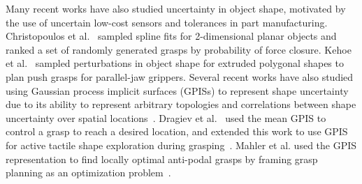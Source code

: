 \documentclass[a4paper, 10pt, conference]{ieeeconf}      %
\begin{document}
Many recent works have also studied uncertainty in object shape, motivated by the use of uncertain low-cost sensors and tolerances in part manufacturing.
Christopoulos et al.~\cite{christopoulos2007handling} sampled spline fits for 2-dimensional planar objects and ranked a set of randomly generated grasps by probability of force closure.
Kehoe et al.~\cite{kehoe2012estimating, kehoe2012toward} sampled perturbations in object shape for extruded polygonal shapes to plan push grasps for parallel-jaw grippers.
Several recent works have also studied using Gaussian process implicit surfaces (GPISs) to represent shape uncertainty due to its ability to represent arbitrary topologies and correlations between shape uncertainty over spatial locations~\cite{dragiev2011, dragiev2013uncertainty, hollinger2013, mahler2015gp}.
Dragiev et al.~\cite{dragiev2011} used the mean GPIS to control a grasp to reach a desired location, and extended this work to use GPIS for active tactile shape exploration during grasping~\cite{dragiev2013uncertainty}.
Mahler et al. used the GPIS representation to find locally optimal anti-podal grasps by framing grasp planning as an optimization problem~\cite{mahler2015gp}. 




\end{document}
